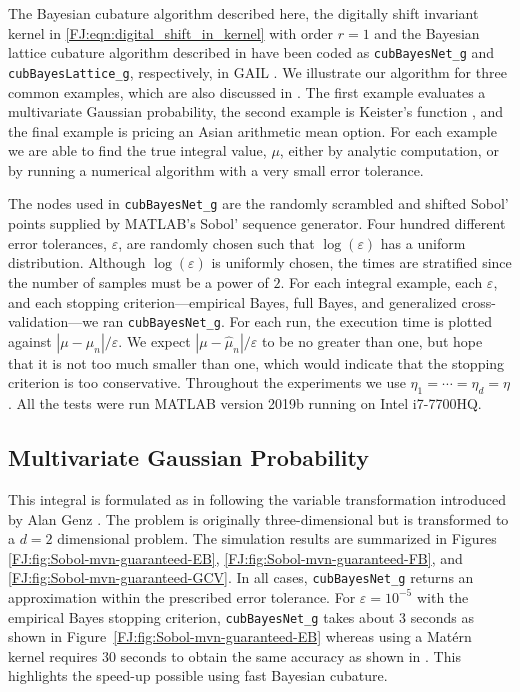 \documentclass[graybox,footinfo]{svmult}
\newcommand{\abs}[1]{\left\lvert #1 \right\rvert} %
\begin{document}
\label{FJ:sec:NumExp}


The Bayesian cubature algorithm described here, the digitally shift invariant kernel in \eqref{FJ:eqn:digital_shift_in_kernel} with order $r=1$  and the Bayesian lattice cubature algorithm described in \cite{RatHic19a} have been coded as  \texttt{cubBayesNet\_g} and \texttt{cubBayesLattice\_g}, respectively, in GAIL \cite{ChoEtal21a}.  We illustrate our algorithm for three common examples, which are also discussed in \cite{RatHic19a}.  The first example evaluates a multivariate Gaussian probability, the second example is Keister's function \cite{Kei96}, and the final example is pricing an Asian arithmetic mean option.  For each example we are able to find the true integral value, $\mu$, either by analytic computation, or by running a numerical algorithm with a very small error tolerance.

The nodes used in \texttt{cubBayesNet\_g} are the randomly scrambled and shifted Sobol' points supplied by MATLAB's Sobol' sequence generator. Four hundred different error tolerances, $\varepsilon$, are randomly chosen such that $\log(\varepsilon)$ has a uniform distribution.   Although $\log(\varepsilon)$ is uniformly chosen, the times are stratified since the number of samples must be a power of $2$.
For each integral example, each $\varepsilon$, and each stopping criterion---empirical Bayes, full Bayes, and generalized cross-validation---we ran \texttt{cubBayesNet\_g}.  For each run, the execution time is plotted against $\abs{\mu - \widehat{\mu}_n}/\varepsilon$.  We expect $\abs{\mu - \widehat{\mu}_n}/\varepsilon$ to be no greater than one, but hope that it is not too much smaller than one, which would indicate that the stopping criterion  is too conservative. Throughout the experiments we use $\eta_1 = \cdots = \eta_d = \eta$.
All the tests were run MATLAB version 2019b running on Intel i7-7700HQ.

\subsection{Multivariate Gaussian Probability}

This integral is formulated as in \cite{RatHic19a} following the variable transformation introduced by Alan Genz \cite{Gen92}. The problem is originally three-dimensional but is transformed to a $d=2$ dimensional problem.  The simulation results are summarized in Figures \ref{FJ:fig:Sobol-mvn-guaranteed-EB}, \ref{FJ:fig:Sobol-mvn-guaranteed-FB}, and \ref{FJ:fig:Sobol-mvn-guaranteed-GCV}.  In all cases, \texttt{cubBayesNet\_g} returns an approximation within the prescribed error tolerance. For  $\varepsilon=10^{-5}$ with the empirical Bayes stopping criterion, \texttt{cubBayesNet\_g} takes about 3 seconds as shown in Figure~\ref{FJ:fig:Sobol-mvn-guaranteed-EB} whereas using a Mat\'ern kernel requires 30 seconds to obtain the same accuracy as shown in \cite{RatHic19a}. This highlights the speed-up possible using fast Bayesian cubature.
\end{document}
